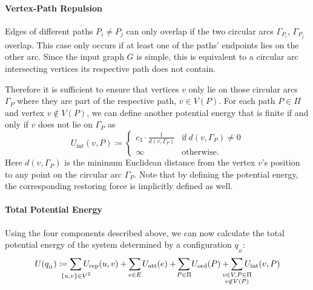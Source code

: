 \paragraph{Vertex-Path Repulsion}

Edges of different paths ${P_i \neq P_j}$ can only overlap if the two circular arcs ${\Gamma_{P_i}}$, ${\Gamma_{P_j}}$ overlap. This case only occurs if at least one of the paths' endpoints lies on the other arc. Since the input graph ${G}$ is simple, this is equivalent to a circular arc intersecting vertices its respective path does not contain.

Therefore it is sufficient to ensure that vertices ${v}$ only lie on those circular arcs ${\Gamma_P}$ where they are part of the respective path, \ie{} ${v \in V(P)}$. For each path ${P \in \Pi}$ and vertex ${v \notin V(P)}$, we can define another potential energy that is finite if and only if ${v}$ does not lie on ${\Gamma_P}$ as
%
\begin{equation*}
  U_\text{int}(v, P) \coloneqq \begin{cases}
    c_3 \cdot \frac{1}{d(v, \Gamma_P)} & \text{if}~d(v, \Gamma_P) \neq 0
    \\
    \infty & \text{otherwise.}
  \end{cases}
\end{equation*}
%
Here ${d(v, \Gamma_P)}$ is the minimum Euclidean distance from the vertex ${v}$'s position to any point on the circular arc ${\Gamma_P}$. Note that by defining the potential energy, the corresponding restoring force is implicitly defined as well.





\paragraph{Total Potential Energy}

Using the four components described above, we can now calculate the total potential energy of the system determined by a configuration ${q_{_\Pi}}$:
%
\begin{equation*}
  U(q_{_\Pi}) \coloneqq
  \sum_{\mathclap{\substack{\lbrace u, v \rbrace \in V^2}}} U_\text{rep}(u, v)
  +
  \sum_{\mathclap{\substack{e \in E}}} U_\text{att}(e)
  +
  \sum_{\mathclap{\substack{P \in \Pi}}} U_\text{ord}(P)
  +
  \sum_{\mathclap{\substack{v \in V, P \in \Pi \\ v \notin V(P)}}} U_\text{int}(v, P)
\end{equation*}

